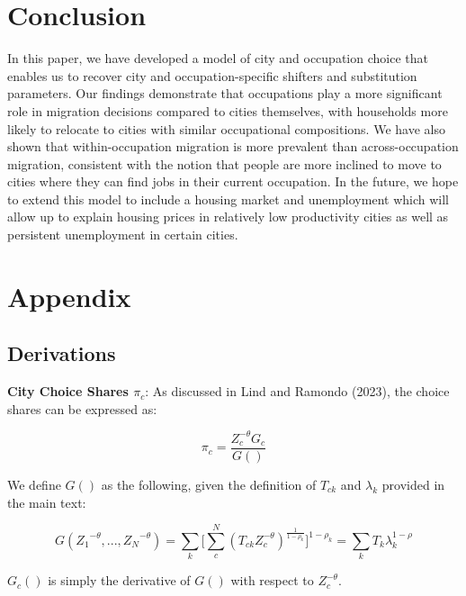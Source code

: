 \documentclass[10pt]{article}
\begin{document}
\section{Conclusion}

In this paper, we have developed a model of city and occupation choice that enables us to recover city and occupation-specific shifters and substitution parameters. Our findings demonstrate that occupations play a more significant role in migration decisions compared to cities themselves, with households more likely to relocate to cities with similar occupational compositions. We have also shown that within-occupation migration is more prevalent than across-occupation migration, consistent with the notion that people are more inclined to move to cities where they can find jobs in their current occupation. In the future, we hope to extend this model to include a housing market and unemployment which will allow up to explain housing prices in relatively low productivity cities as well as persistent unemployment in certain cities.

\newpage


\newpage

\section{Appendix}

\subsection{Derivations}

\noindent\textbf{City Choice Shares $\pi_{c}$}: As discussed in Lind and Ramondo (2023), the choice shares can be expressed as:

\begin{equation*}
    \pi_{c}=\frac{Z_{c}^{-\theta}{G_{c}}}{G()}
\end{equation*}

We define $G()$ as the following, given the definition of $T_{ck}$ and $\lambda_{k}$ provided in the main text:

\begin{equation*}
    G({Z_{1}}^{-\theta},...,{Z_{N}}^{-\theta})=\sum\limits_{k}\Big[\sum\limits_{c}^{N}({T_{ck}}{Z_{c}^{-\theta}})^{\frac{1}{1-\rho_{k}}}\Big]^{1-\rho_{k}} = \sum\limits_{k}{T_{k}}\lambda^{1-\rho}_{k}
\end{equation*}

$G_{c}()$ is simply the derivative of $G()$ with respect to $Z_{c}^{-\theta}$.
\end{document}
